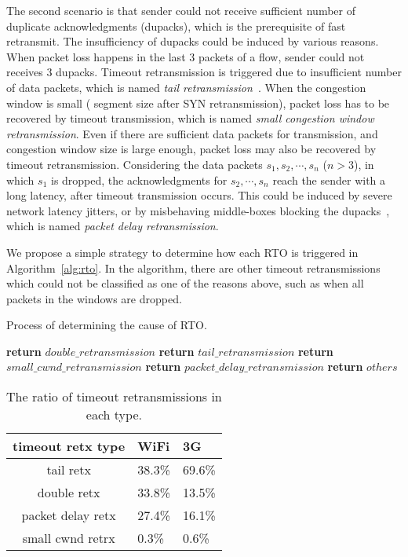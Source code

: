 The second scenario is that sender could not receive sufficient number of duplicate acknowledgments (dupacks), which is the prerequisite of fast retransmit. The insufficiency of dupacks could be induced by various reasons. When packet loss happens in the last 3 packets of a flow, sender could not receives 3 dupacks. Timeout retransmission is triggered due to insufficient number of data packets, which is named \emph{tail retransmission}~\cite{flach2013reducing}. When the congestion window is small ( segment size after SYN retransmission), packet loss has to be recovered by timeout transmission, which is named \emph{small congestion window retransmission}. Even if there are sufficient data packets for transmission, and congestion window size is large enough, packet loss may also be recovered by timeout retransmission. Considering the data packets $s_1, s_2, \cdots, s_n$ ($n > 3$), in which $s_1$ is dropped, the acknowledgments for $s_2, \cdots, s_n$ reach the sender with a long latency, after timeout transmission occurs. This could be induced by severe network latency jitters, or by misbehaving middle-boxes blocking the dupacks~\cite{honda2011isit}, which is named \emph{packet delay retransmission}.

We propose a simple strategy to determine how each RTO is triggered in Algorithm~\ref{alg:rto}. In the algorithm, there are other timeout retransmissions which could not be classified as one of the reasons above, such as when all packets in the windows are dropped. 

\begin{algorithm}
	\caption{Process of determining the cause of RTO.}
	\label{alg:rto}
	\begin{algorithmic}[1]
				\State \textbf{return} $double\_retransmission$
				\State \textbf{return} $tail\_retransmission$
				\State \textbf{return} $small\_cwnd\_retransmission$
				\State \textbf{return} $packet\_delay\_retransmission$
			\Else
				\State \textbf{return} $others$
			\EndIf
		\EndProcedure
	\end{algorithmic}
\end{algorithm}

\begin{table}[th]
\caption{The ratio of timeout retransmissions in each type.}
\label{tab:rto_type}
\centering
\renewcommand{\arraystretch}{1.0}
\begin{tabular}{c|C{1.1cm}|C{1.1cm}}
	\hline
	\textbf{timeout retx type} & WiFi & 3G \\
	\hline
	tail retx & 38.3\% & 69.6\% \\
	\hline
	double retx & 33.8\% & 13.5\% \\
	\hline
	packet delay retx & 27.4\% & 16.1\% \\
	\hline
	small cwnd retrx & 0.3\% & 0.6\% \\
	\hline
\end{tabular}
\end{table}


